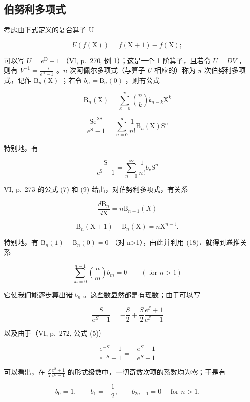 \subsection{伯努利多项式}

考虑由下式定义的复合算子 U

\[
U (f (\mathrm{X})) = f (\mathrm{X} + 1) - f (\mathrm{X});
\]

可以写 \(U = e^{\mathrm{D}} - 1\) （VI, p.~270, 例 1）；这是一个 1 阶算子，且若令 \(U = DV\) ，则有 \(V^{-1} = \frac{\mathrm{D}}{e^{\mathrm{D}} - 1}\) 。\(n\) 次阿佩尔多项式（与算子 \(U\) 相应的）称为 \(n\) 次伯努利多项式，记作 \(\mathrm{B}_n(\mathrm{X})\) ；若令 \(b_n = \mathrm{B}_n(0)\) ，则有公式

\[
\mathrm{B} _ {n} (\mathrm{X}) = \sum_ {k = 0} ^ {n} \binom{n}{k} b _ {n - k} \mathrm{X} ^ {k}\tag{18}
\]

\[
\frac {\mathrm{Se} ^ {\mathrm{XS}}}{e ^ {\mathrm{S}} - 1} = \sum_ {n = 0} ^ {\infty} \frac {1}{n !} \mathrm{B} _ {n} (\mathrm{X}) \mathrm{S} ^ {n}\tag{19}
\]

特别地，有

\[
{\frac {\mathrm{S}}{e ^ {\mathrm{S}} - 1}} = \sum_ {n = 0} ^ {\infty} {\frac {1}{n !}} b _ {n} \mathrm{S} ^ {n}\tag{20}
\]

VI, p.~273 的公式 (7) 和 (9) 给出，对伯努利多项式，有关系

\[
\frac {d \mathrm{B} _ {n}}{d \mathrm{X}} = n \mathrm{B} _ {n - 1} (X)\tag{21}
\]

\[
\mathrm{B} _ {n} (\mathrm{X} + 1) - \mathrm{B} _ {n} (\mathrm{X}) = n \mathrm{X} ^ {n - 1}.\tag{22}
\]

特别地，有 \(\mathrm{B}_{n}(1)-\mathrm{B}_{n}(0)=0\) （对 n\textgreater1），由此并利用 (18)，就得到递推关系

\[
\sum_ {m = 0} ^ {n - 1} \binom {n} {m} b _ {m} = 0 \qquad (\text { for } n > 1)\tag{23}
\]

它使我们能逐步算出诸 \(b_{n}\) 。这些数显然都是有理数；由于可以写

\[
{\frac {S}{e ^ {S} - 1}} = - {\frac {S}{2}} + {\frac {S}{2}} {\frac {e ^ {S} + 1}{e ^ {S} - 1}}
\]

以及由于（VI, p.~272, 公式 (5)）

\[
\frac {e ^ {- S} + 1}{e ^ {- S} - 1} = - \frac {e ^ {S} + 1}{e ^ {S} - 1}
\]

可以看出，在 \(\frac{S}{2}\frac{e^{S}+1}{e^{S}-1}\) 的形式级数中，一切奇数次项的系数均为零；于是有

\[
b _ {0} = 1, \qquad b _ {1} = - \frac {1}{2}, \qquad b _ {2 n - 1} = 0 \quad \text { for } n > 1.\tag{24}
\]

